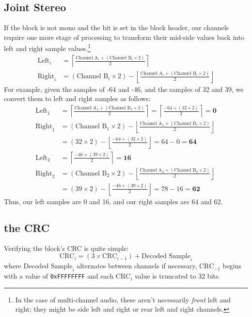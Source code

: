 \clearpage

\subsection{Joint Stereo}

If the block is not mono and the  bit is set
in the block header, our channels require one more stage of processing
to transform their mid-side values back into left and right sample
values.\footnote{In the case of multi-channel audio, these aren't
necessarily \textit{front} left and right; they might be
side left and right or rear left and right channels.}
\begin{align*}
\text{Left}_i &= \left\lceil\frac{\text{Channel A}_i + (\text{Channel B}_i \times 2)}{2}\right\rceil \\
\text{Right}_i &= (\text{Channel B}_i \times 2) - \left\lfloor\frac{\text{Channel A}_i + (\text{Channel B}_i \times 2)}{2}\right\rfloor
\end{align*}
For example, given the  samples of -64 and -46, and the
 samples of 32 and 39, we convert them to left
and right samples as follows:
\begin{align*}
\text{Left}_1 &= \left\lceil\frac{\text{Channel A}_1 + (\text{Channel B}_1 \times 2)}{2}\right\rceil = \left\lceil\frac{-64 + (32 \times 2)}{2}\right\rceil = \textbf{0} \\
\text{Right}_1 &= (\text{Channel B}_1 \times 2) - \left\lfloor\frac{\text{Channel A}_1 + (\text{Channel B}_1 \times 2)}{2}\right\rfloor \\
&= (32 \times 2) - \left\lfloor\frac{-64 + (32 \times 2)}{2}\right\rfloor = 64 - 0 = \textbf{64} \\
\text{Left}_2 &= \left\lceil\frac{-46 + (39 \times 2)}{2}\right\rceil = \textbf{16} \\
\text{Right}_2 &= (\text{Channel B}_2 \times 2) - \left\lfloor\frac{\text{Channel A}_2 + (\text{Channel B}_2 \times 2)}{2}\right\rfloor \\
&= (39 \times 2) - \left\lfloor\frac{-46 + (39 \times 2)}{2}\right\rfloor = 78 - 16 = \textbf{62}
\end{align*}
Thus, our left samples are 0 and 16, and our right samples are 64 and 62.

\subsection{the CRC}

Verifying the block's CRC is quite simple:
\begin{equation*}
\text{CRC}_i = (3 \times \text{CRC}_{i - 1}) + \text{Decoded Sample}_i
\end{equation*}
where $\text{Decoded Sample}_i$ alternates between channels if necessary,
$\text{CRC}_{-1}$ begins with a value of \texttt{0xFFFFFFFF}
and each $\text{CRC}_i$ value is truncated to 32 bits.

